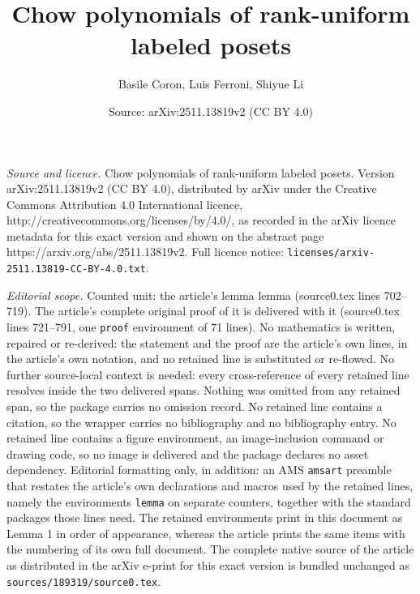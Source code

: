 \documentclass[10pt,a4paper]{amsart}
\title{Chow polynomials of rank-uniform labeled posets}
\author{Basile Coron, Luis Ferroni, Shiyue Li}
\date{Source: arXiv:2511.13819v2 (CC BY 4.0)}
\begin{document}
\maketitle

\noindent\emph{Source and licence.} Chow polynomials of rank-uniform labeled posets. Version arXiv:2511.13819v2 (CC BY 4.0), distributed by arXiv under the Creative Commons Attribution 4.0 International licence, http://creativecommons.org/licenses/by/4.0/, as recorded in the arXiv licence metadata for this exact version and shown on the abstract page https://arxiv.org/abs/2511.13819v2. Full licence notice: \texttt{licenses/arxiv-2511.13819-CC-BY-4.0.txt}.\par\smallskip

\noindent\textit{Editorial scope.} Counted unit: the article's lemma lemma (source0.tex lines 702--719). The article's complete original proof of it is delivered with it (source0.tex lines 721--791, one \texttt{proof} environment of 71 lines). No mathematics is written, repaired or re-derived: the statement and the proof are the article's own lines, in the article's own notation, and no retained line is substituted or re-flowed.  No further source-local context is needed: every cross-reference of every retained line resolves inside the two delivered spans.  Nothing was omitted from any retained span, so the package carries no omission record.  No retained line contains a citation, so the wrapper carries no bibliography and no bibliography entry.  No retained line contains a figure environment, an image-inclusion command or drawing code, so no image is delivered and the package declares no asset dependency.  Editorial formatting only, in addition: an AMS \texttt{amsart} preamble that restates the article's own declarations and macros used by the retained lines, namely the environments \texttt{lemma} on separate counters, together with the standard packages those lines need.  The retained environments print in this document as Lemma 1 in order of appearance, whereas the article prints the same items with the numbering of its own full document.  The complete native source of the article as distributed in the arXiv e-print for this exact version is bundled unchanged as \texttt{sources/189319/source0.tex}.
\end{document}
